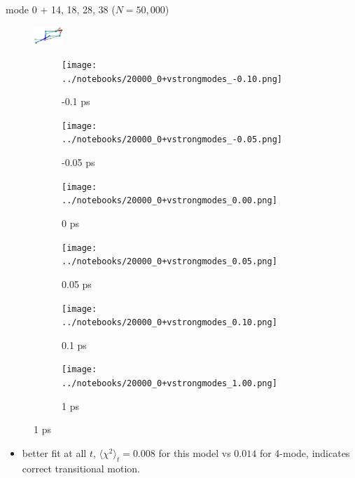 \documentclass{beamer}
\newcommand\w{0.32}
\begin{document}
\begin{frame}{mode 0 + 14, 18, 28, 38 ($N=50{,}000$)}
	\vspace{-4mm}
	\begin{figure}
		\centering
		\includegraphics[width=0.1\textwidth]{mode0_ot.png}
	\end{figure}
\vspace{-5mm}
	\begin{figure}
		\centering
		\begin{subfigure}[b]{\w\textwidth}
			\centering
			\texttt{[image: ../notebooks/20000\_0+vstrongmodes\_-0.10.png]}
			\caption{-0.1 ps}
		\end{subfigure}
		\begin{subfigure}[b]{\w\textwidth}
			\centering
			\texttt{[image: ../notebooks/20000\_0+vstrongmodes\_-0.05.png]}
			\caption{-0.05 ps}
		\end{subfigure}
		\begin{subfigure}[b]{\w\textwidth}
			\centering
			\texttt{[image: ../notebooks/20000\_0+vstrongmodes\_0.00.png]}
			\caption{0 ps}
		\end{subfigure}
		\begin{subfigure}[b]{\w\textwidth}
			\centering
			\texttt{[image: ../notebooks/20000\_0+vstrongmodes\_0.05.png]}
			\caption{0.05 ps}
		\end{subfigure}
		\begin{subfigure}[b]{\w\textwidth}
			\centering
			\texttt{[image: ../notebooks/20000\_0+vstrongmodes\_0.10.png]}
			\caption{0.1 ps}
		\end{subfigure}
		\begin{subfigure}[b]{\w\textwidth}
			\centering
			\texttt{[image: ../notebooks/20000\_0+vstrongmodes\_1.00.png]}
			\caption{1 ps}
		\end{subfigure}
	\end{figure}
\begin{itemize}
	\item better fit at all $t$, $\langle\chi^2\rangle_t = 0.008$ for this model vs $0.014$ for 4-mode, indicates correct transitional motion.
\end{itemize}
\end{frame}
\end{document}
